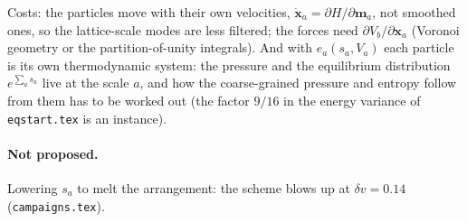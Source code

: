 \documentclass[11pt,aps,preprint,nofootinbib,superscriptaddress,tightenlines]{revtex4-2}
\let\oldparagraph\paragraph
\renewcommand{\paragraph}{\par\bigskip\oldparagraph}
\begin{document}
Costs: the particles move with their own velocities, $\dot{\bm x}_a=\partial H/\partial\bm m_a$,
not smoothed ones, so the lattice-scale modes are less filtered; the forces need
$\partial V_b/\partial\bm x_a$ (Voronoi geometry or the partition-of-unity integrals).  And with
$e_a(s_a,V_a)$ each particle is its own thermodynamic system: the pressure and the equilibrium
distribution $e^{\sum_as_a}$ live at the scale $a$, and how the coarse-grained pressure and
entropy follow from them has to be worked out (the factor $9/16$ in the energy variance of
\texttt{eqstart.tex} is an instance).

\paragraph{Not proposed.}  Lowering $s_a$ to melt the arrangement: the scheme blows up at
$\delta v=0.14$ (\texttt{campaigns.tex}).
\end{document}

